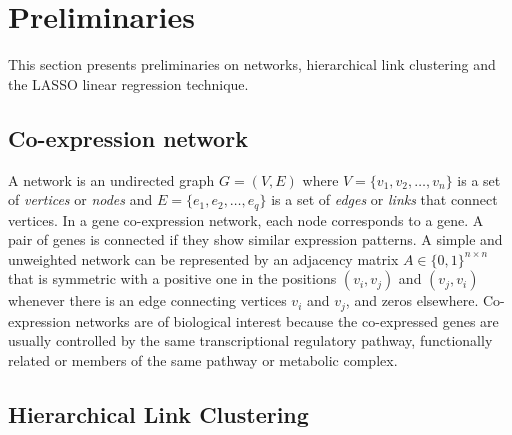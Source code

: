 \section{Preliminaries}
\label{sec.prelim}

This section presents preliminaries on networks, hierarchical link
clustering and the LASSO linear regression technique.

\subsection{Co-expression network}

A network is an undirected graph $G=(V,E)$ where
${V=\{v_1,v_2,\ldots,v_{n}\}}$ is a set of \textit{vertices} or
\textit{nodes} and ${E=\{e_1,e_2,\ldots,e_q\}}$ is a set of
\textit{edges} or \textit{links} that connect vertices. In a gene
co-expression network, each node corresponds to a gene. A pair of
genes is connected if they show similar expression
patterns. A simple and unweighted network can be represented by an
adjacency matrix $A \in \{0,1\}^{n \times n}$ that is symmetric with a
positive one in the positions $(v_i,v_j)$ and $(v_j,v_i)$ whenever
there is an edge connecting vertices $v_i$ and $v_j$, and zeros
elsewhere. Co-expression networks are of biological interest because
the co-expressed genes are usually controlled by the same
transcriptional regulatory pathway, functionally related or members of
the same pathway or metabolic complex.


\subsection{Hierarchical Link Clustering}

